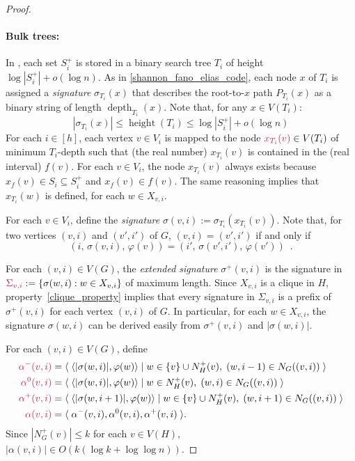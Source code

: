 \documentclass[twoside,leqno]{article}
\makeatletter
\renewcommand{\le}{\leqslant}
\newcommand{\defin}[1]{\emph{\textcolor{brightmaroon}{#1}}}
\def\mathcolor#1#{\@mathcolor{#1}}
\def\@mathcolor#1#2#3{%
  \protect\leavevmode
  \begingroup
    \color#1{#2}#3%
  \endgroup
}
\newcommand{\mathdefin}[1]{\mathcolor{brightmaroon}{#1}}
\DeclareMathOperator{\height}{height}
\DeclareMathOperator{\depth}{depth}
\newcommand{\Oh}{O}
\makeatother
\begin{document}
\begin{proof}
  \paragraph{Bulk trees:}
  In \cite{dujmovic.esperet.ea:adjacency}, each set $S^+_i$ is stored in a binary search tree $T_i$ of height $\log|S^+_i|+o(\log n)$.
  As in \cref{shannon_fano_elias_code}, each node $x$ of $T_i$ is assigned a \defin{signature} \defin{$\sigma_{T_i}(x)$} that describes the root-to-$x$ path $P_{T_i}(x)$ as a binary string of length $\depth_{T_i}(x)$.
  Note that, for any $x\in V(T_i)$:
  \[
    |\sigma_{T_i}(x)| \le \height(T_i) \le \log|S^+_i|+o(\log n)
  \]
  For each $i\in[h]$, each vertex $v\in V_i$ is mapped to the node $\mathdefin{x_{T_i}(v)}\in V(T_i)$ of minimum $T_i$-depth such that (the real number) $x_{T_i}(v)$ is contained in the (real interval) $f(v)$.
  For each $v\in V_i$, the node $x_{T_i}(v)$ always exists because $x_f(v)\in S_i\subseteq S_i^+$ and $x_f(v)\in f(v)$.  The same reasoning implies that $x_{T_i}(w)$ is defined, for each $w\in X_{v,i}$.

  For each $v\in V_i$, define the \defin{signature} $\sigma(v,i):=\sigma_{T_i}(x_{T_i}(v))$.  Note that, for two vertices $(v,i)$ and $(v',i')$ of $G$, $(v,i)=(v',i')$ if and only if
  \begin{equation}
    (i,\,\sigma(v,i),\,\varphi(v)) = (i',\,\sigma(v',i'),\,\varphi(v')) \enspace .
    \label{ps_identity}
  \end{equation}

  For each $(v,i)\in V(G)$, the \defin{extended signature} \defin{$\sigma^+(v,i)$} is the signature in $\mathdefin{\Sigma_{v,i}}:=\{\sigma(w,i):w\in X_{v,i}\}$ of maximum length.  Since $X_{v,i}$ is a clique in $H$, property~\ref{clique_property} implies that every signature in $\Sigma_{v,i}$ is a prefix of $\sigma^+(v,i)$ for each vertex $(v,i)$ of $G$.  In particular, for each $w\in X_{v,i}$, the signature $\sigma(w,i)$ can be derived easily from $\sigma^+(v,i)$ and $|\sigma(w,i)|$.

  For each $(v,i)\in V(G)$, define
  \begin{align*}
    \mathdefin{\alpha^{-}(v,i)}
     & = \langle\; \langle |\sigma(w,i)|, \varphi(w)\rangle \mid w\in \{v\}\cup N^+_H(v),\; (w,i-1)\in N_G((v,i)) \;\rangle   \\
    \mathdefin{\alpha^{0}(v,i)}
     & = \langle\; \langle |\sigma(w,i)|, \varphi(w)\rangle \mid w\in N^+_H(v),\; (w,i)\in N_G((v,i)) \;\rangle               \\
    \mathdefin{\alpha^+(v,i)}
     & = \langle\; \langle |\sigma(w,i+1)|, \varphi(w)\rangle \mid w\in \{v\}\cup N^+_H(v),\; (w,i+1)\in N_G((v,i)) \;\rangle \\
    \mathdefin{\alpha(v,i)}
     & = \langle\; \alpha^-(v,i),\alpha^0(v,i),\alpha^+(v,i) \;\rangle        .
  \end{align*}
  Since $|N^+_G(v)|\le k$ for each $v\in V(H)$, $|\alpha(v,i)|\in\Oh(k(\log k + \log\log n))$.


\end{proof}
\end{document}
